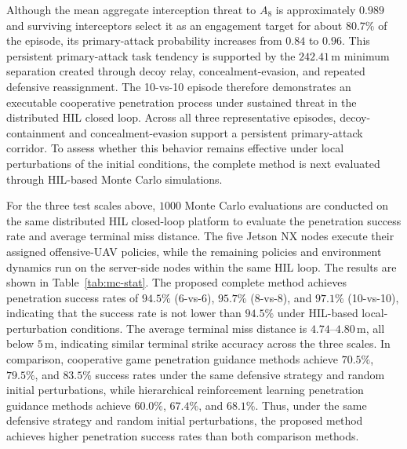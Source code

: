 \documentclass{cja}
\begin{document}
Although the mean aggregate interception threat to $A_8$ is approximately $0.989$ and surviving interceptors select it as an engagement target for about $80.7\%$ of the episode, its primary-attack probability increases from $0.84$ to $0.96$. This persistent primary-attack task tendency is supported by the $242.41\,\mathrm{m}$ minimum separation created through decoy relay, concealment-evasion, and repeated defensive reassignment. The 10-vs-10 episode therefore demonstrates an executable cooperative penetration process under sustained threat in the distributed HIL closed loop. Across all three representative episodes, decoy-containment and concealment-evasion support a persistent primary-attack corridor. To assess whether this behavior remains effective under local perturbations of the initial conditions, the complete method is next evaluated through HIL-based Monte Carlo simulations.

For the three test scales above, $1000$ Monte Carlo evaluations are conducted on the same distributed HIL closed-loop platform to evaluate the penetration success rate and average terminal miss distance. The five Jetson NX nodes execute their assigned offensive-UAV policies, while the remaining policies and environment dynamics run on the server-side nodes within the same HIL loop. The results are shown in Table~\ref{tab:mc-stat}. The proposed complete method achieves penetration success rates of $94.5\%$ (6-vs-6), $95.7\%$ (8-vs-8), and $97.1\%$ (10-vs-10), indicating that the success rate is not lower than $94.5\%$ under HIL-based local-perturbation conditions. The average terminal miss distance is $4.74$--$4.80\,\mathrm{m}$, all below $5\,\mathrm{m}$, indicating similar terminal strike accuracy across the three scales.
In comparison, cooperative game penetration guidance methods\cite{Chen2024CJA,Chen2024TAES} achieve $70.5\%$, $79.5\%$, and $83.5\%$ success rates under the same defensive strategy and random initial perturbations, while hierarchical reinforcement learning penetration guidance methods\cite{Hui2025CJA} achieve $60.0\%$, $67.4\%$, and $68.1\%$. Thus, under the same defensive strategy and random initial perturbations, the proposed method achieves higher penetration success rates than both comparison methods.
\end{document}
